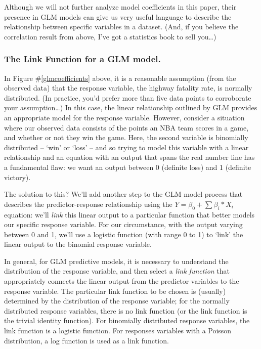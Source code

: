 \documentclass[12pt]{article}\usepackage[]{graphicx}\usepackage[]{color}
\begin{document}
Although we will not further analyze model coefficients in this paper, their presence in GLM models can give us very useful language to describe the relationship between specific variables in a dataset.  (And, if you believe the correlation result from above, I've got a statistics book to sell you\dots)

	\subsubsection{The Link Function for a GLM model.}

In Figure \#\ref{glmcoefficients} above, it is a reasonable assumption (from the observed data) that the response variable, the highway fatality rate, is normally 
distributed.  (In practice, you'd prefer more than five data points to corroborate your assumption\dots)  In this case, the linear relationship
outlined by GLM provides an appropriate model for the response variable.  However, consider a situation where our observed data consists of the 
points an NBA team scores in a game, and whether or not they win the game.  Here, the second variable is binomially distributed -- `win' or `loss' 
-- and so trying to model this variable with a linear relationship and an equation with an output that spans the real number line has a fundamental
flaw:  we want an output between 0 (definite loss) and 1 (definite victory).


The solution to this?  We'll add another step to the GLM model process that describes the predictor-response relationship using the 
$Y=\beta_0 + \sum \beta_i*X_i$ equation:  we'll \textit{link} this linear output to a particular function that better models our specific response
variable.  For our circumstance, with the output varying between 0 and 1, we'll use a logistic function (with range 0 to 1) to `link' the linear 
output to the binomial response variable.  


In general, for GLM predictive models, it is necessary to understand the distribution of the response variable, and then select a
\textit{link function} that appropriately connects the linear output from the predictor variables to the response variable.  The particular
link function to be chosen is (usually) determined by the distribution of the response variable; for the normally distributed response variables,
there is no link function (or the link function is the trivial identity function).  For binomially distributed response variables, the link 
function is a logistic function.  For responses variables with a Poisson distribution, a log function is used as a link function.
\end{document}
